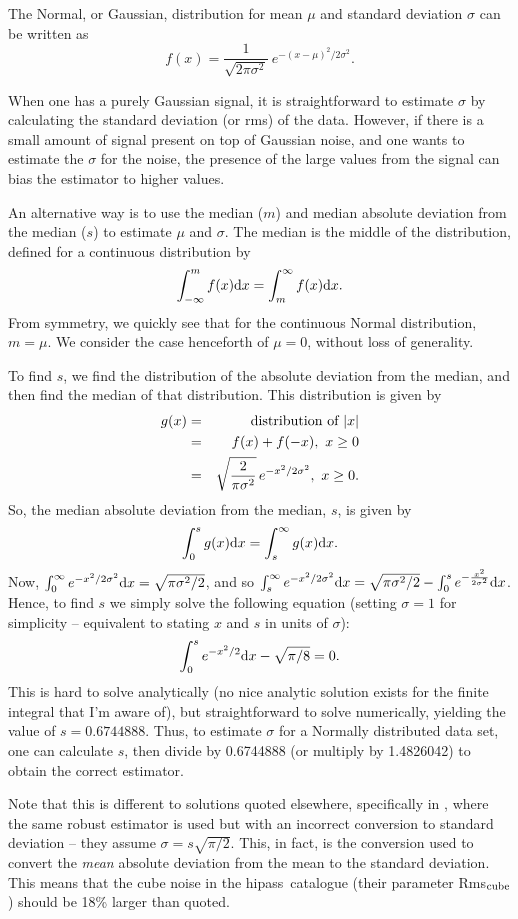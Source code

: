 \documentclass[12pt,a4paper]{article}
\newcommand{\hipass}{{\sc hipass}}
\newcommand{\diff}{{\rm d}}
\begin{document}
The Normal, or Gaussian, distribution for mean $\mu$ and standard
deviation $\sigma$ can be written as 
\[ 
f(x) = \frac{1}{\sqrt{2\pi\sigma^2}}\ e^{-(x-\mu)^2/2\sigma^2}.
 \]

When one has a purely Gaussian signal, it is straightforward to
estimate $\sigma$ by calculating the standard deviation (or rms) of
the data. However, if there is a small amount of signal present on top
of Gaussian noise, and one wants to estimate the $\sigma$ for the
noise, the presence of the large values from the signal can bias the
estimator to higher values.

An alternative way is to use the median ($m$) and median absolute deviation
from the median ($s$) to estimate $\mu$ and $\sigma$. The median is the
middle of the distribution, defined for a continuous distribution by
\[
\int_{-\infty}^{m} f(x) \diff x = \int_{m}^{\infty} f(x) \diff x.
\]
From symmetry, we quickly see that for the continuous Normal
distribution, $m=\mu$. We consider the case henceforth of $\mu=0$,
without loss of generality.

To find $s$, we find the distribution of the absolute deviation from
the median, and then find the median of that distribution. This
distribution is given by
\begin{eqnarray*}
g(x) &= &{\mbox{\rm distribution of }} |x|\\
     &= &f(x) + f(-x),\ x\ge0\\
     &= &\sqrt{\frac{2}{\pi\sigma^2}}\, e^{-x^2/2\sigma^2},\ x\ge0.
\end{eqnarray*}
So, the median absolute deviation from the median, $s$, is given by
\[
\int_{0}^{s} g(x) \diff x = \int_{s}^{\infty} g(x) \diff x.
\]
Now, $\int_{0}^{\infty}e^{-x^2/2\sigma^2} \diff x = \sqrt{\pi\sigma^2/2}$, and
so $\int_{s}^{\infty} e^{-x^2/2\sigma^2} \diff x =
\sqrt{\pi\sigma^2/2} - \int_{0}^{s} e^{-\frac{x^2}{2\sigma^2}} \diff x
$. Hence, to find $s$ we simply solve the following equation (setting $\sigma=1$ for
simplicity -- equivalent to stating $x$ and $s$ in units of $\sigma$):
\[
\int_{0}^{s}e^{-x^2/2} \diff x - \sqrt{\pi/8} = 0.
\]
This is hard to solve analytically (no nice analytic solution exists
for the finite integral that I'm aware of), but straightforward to
solve numerically, yielding the value of $s=0.6744888$. Thus, to
estimate $\sigma$ for a Normally distributed data set, one can calculate
$s$, then divide by 0.6744888 (or multiply by 1.4826042) to obtain the
correct estimator.

Note that this is different to solutions quoted elsewhere,
specifically in \citet{meyer04:trunc}, where the same robust estimator
is used but with an incorrect conversion to standard deviation -- they
assume $\sigma = s\sqrt{\pi/2}$. This, in fact, is the conversion used
to convert the {\it mean} absolute deviation from the mean to the
standard deviation. This means that the cube noise in the \hipass\
catalogue (their parameter Rms$_{\rm cube}$) should be 18\% larger
than quoted.
\end{document}

